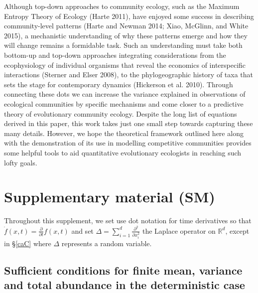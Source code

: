 \documentclass[]{article}
\begin{document}
Although top-down approaches to community ecology, such as the Maximum
Entropy Theory of Ecology (Harte 2011), have enjoyed some success in
describing community-level patterns (Harte and Newman 2014; Xiao,
McGlinn, and White 2015), a mechanistic understanding of why these
patterns emerge and how they will change remains a formidable task. Such
an understanding must take both bottom-up and top-down approaches
integrating considerations from the ecophysiology of individual
organisms that reveal the economics of interspecific interactions
(Sterner and Elser 2008), to the phylogeographic history of taxa that
sets the stage for contemporary dynamics (Hickerson et al. 2010).
Through connecting these dots we can increase the variance explained in
observations of ecological communities by specific mechanisms and come
closer to a predictive theory of evolutionary community ecology. Despite
the long list of equations derived in this paper, this work takes just
one small step towards capturing these many details. However, we hope
the theoretical framework outlined here along with the demonstration of
its use in modelling competitive communities provides some helpful tools
to aid quantitative evolutionary ecologists in reaching such lofty
goals.

\newpage

\hypertarget{supplementary-material-sm}{%
\section{Supplementary material (SM)}\label{supplementary-material-sm}}

Throughout this supplement, we set use dot notation for time derivatives
so that \(\dot f(x,t)=\frac{\partial }{\partial t}f(x,t)\) and set
\(\Delta=\sum_{i=1}^d\frac{\partial^2}{\partial x_i^2}\) the Laplace
operator on \(\mathbb{R}^d\), except in \S\ref{caC} where \(\Delta\)
represents a random variable.

\hypertarget{sufficient-conditions-for-finite-mean-variance-and-total-abundance-in-the-deterministic-case}{%
\subsection{\texorpdfstring{Sufficient conditions for finite mean,
variance and total abundance in the deterministic case
\label{finite}}{Sufficient conditions for finite mean, variance and total abundance in the deterministic case }}\label{sufficient-conditions-for-finite-mean-variance-and-total-abundance-in-the-deterministic-case}}
\end{document}
